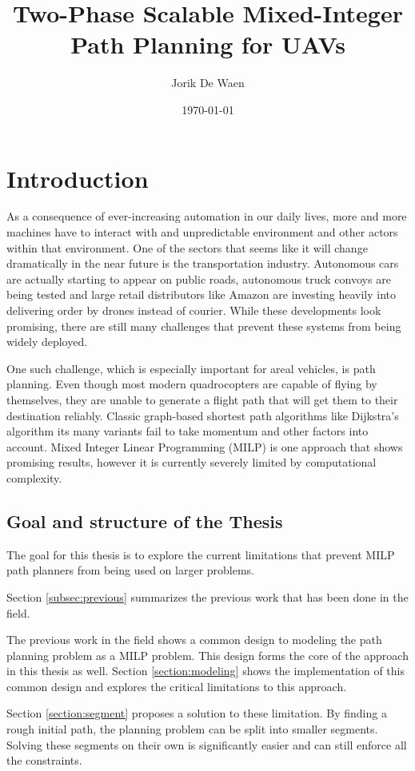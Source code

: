 \documentclass[12pt]{article}
\title{Two-Phase Scalable Mixed-Integer Path Planning for UAVs}
\author{Jorik De Waen}
\date{\today}
\begin{document}
\maketitle

\section{Introduction}
As a consequence of ever-increasing automation in our daily lives, more and more machines have to interact with and unpredictable environment and other actors within that environment. One of the sectors that seems like it will change dramatically in the near future is the transportation industry. Autonomous cars are actually starting to appear on public roads, autonomous truck convoys are being tested and large retail distributors like Amazon are investing heavily into delivering order by drones instead of courier. While these developments look promising, there are still many challenges that prevent these systems from being widely deployed.

One such challenge, which is especially important for areal vehicles, is path planning. Even though most modern quadrocopters are capable of flying by themselves, they are unable to generate a flight path that will get them to their destination reliably. Classic graph-based shortest path algorithms like Dijkstra's algorithm its many variants fail to take momentum and other factors into account. Mixed Integer Linear Programming (MILP) is one approach that shows promising results, however it is currently severely limited by computational complexity.




\subsection{Goal and structure of the Thesis}
The goal for this thesis is to explore the current limitations that prevent MILP path planners from being used on larger problems. 

Section \ref{subsec:previous} summarizes the previous work that has been done in the field.

The previous work in the field shows a common design to modeling the path planning problem as a MILP problem. This design forms the core of the approach in this thesis as well. Section \ref{section:modeling} shows the implementation of this common design and explores the critical limitations to this approach.

Section \ref{section:segment} proposes a solution to these limitation. By finding a rough initial path, the planning problem can be split into smaller segments. Solving these segments on their own is significantly easier and can still enforce all the constraints.
\end{document}
